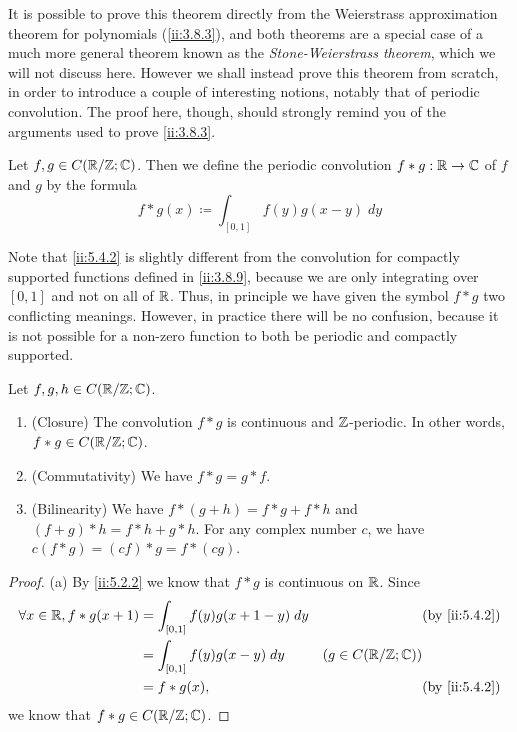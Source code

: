 \begin{note}
  It is possible to prove this theorem directly from the Weierstrass approximation theorem for polynomials (\cref{ii:3.8.3}), and both theorems are a special case of a much more general theorem known as the \emph{Stone-Weierstrass theorem}, which we will not discuss here.
  However we shall instead prove this theorem from scratch, in order to introduce a couple of interesting notions, notably that of periodic convolution.
  The proof here, though, should strongly remind you of the arguments used to prove \cref{ii:3.8.3}.
\end{note}

\begin{defn}\label{ii:5.4.2}
  Let \(f, g \in C(\mathbb{R} / \mathbb{Z} ; \mathbb{C})\).
  Then we define the periodic convolution \(f * g : \mathbb{R} \to \mathbb{C}\) of \(f\) and \(g\) by the formula
  \[
    f * g(x) \coloneqq \int_{[0, 1]} f(y) g(x - y) \; dy
  \]
\end{defn}

\begin{rmk}\label{ii:5.4.3}
  Note that \cref{ii:5.4.2} is slightly different from the convolution for compactly supported functions defined in \cref{ii:3.8.9}, because we are only integrating over \([0, 1]\) and not on all of \(\mathbb{R}\).
  Thus, in principle we have given the symbol \(f * g\) two conflicting meanings.
  However, in practice there will be no confusion, because it is not possible for a non-zero function to both be periodic and compactly supported.
\end{rmk}

\begin{lem}\label{ii:5.4.4}
  Let \(f, g, h \in C(\mathbb{R} / \mathbb{Z} ; \mathbb{C})\).
  \begin{enumerate}
    \item (Closure)
          The convolution \(f * g\) is continuous and \(\mathbb{Z}\)-periodic.
          In other words, \(f * g \in C(\mathbb{R} / \mathbb{Z} ; \mathbb{C})\).
    \item (Commutativity)
          We have \(f * g = g * f\).
    \item (Bilinearity)
          We have \(f * (g + h) = f * g + f * h\) and \((f + g) * h = f * h + g * h\).
          For any complex number \(c\), we have \(c(f * g) = (cf) * g = f * (cg)\).
  \end{enumerate}
\end{lem}

\begin{proof}{(a)}
  By \cref{ii:5.2.2} we know that \(f * g\) is continuous on \(\mathbb{R}\).
  Since
  \begin{align*}
    \forall x \in \R, f * g(x + 1) & = \int_{[0, 1]} f(y) g(x + 1 - y) \; dy &                         & \by{ii:5.4.2} \\
                                   & = \int_{[0, 1]} f(y) g(x - y) \; dy     & (g \in C(\R / \Z ; \C))                 \\
                                   & = f * g(x),                             &                         & \by{ii:5.4.2}
  \end{align*}
  we know that \(f * g \in C(\mathbb{R} / \mathbb{Z} ; \mathbb{C})\).
\end{proof}

